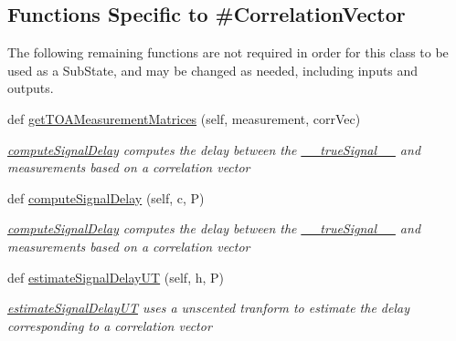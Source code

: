 \subsection*{Functions Specific to \#Correlation\+Vector}
\label{_amgrpb77571167b4af2d56b573fb28e024ebf}%
The following remaining functions are not required in order for this class to be used as a Sub\+State, and may be changed as needed, including inputs and outputs.\begin{DoxyCompactItemize}
\item 
def \hyperlink{classmodest_1_1substates_1_1correlationvector_1_1CorrelationVector_a71f11fa45819ecb464890be81ecc9781}{get\+T\+O\+A\+Measurement\+Matrices} (self, measurement, corr\+Vec)
\begin{DoxyCompactList}\small\item\em \hyperlink{classmodest_1_1substates_1_1correlationvector_1_1CorrelationVector_a0d0188e2923b59ba3e620927f1aaf84a}{compute\+Signal\+Delay} computes the delay between the \hyperlink{classmodest_1_1substates_1_1correlationvector_1_1CorrelationVector_af2f52cea1c695f36dd100f529c322e94}{\+\_\+\+\_\+true\+Signal\+\_\+\+\_\+} and measurements based on a correlation vector \end{DoxyCompactList}\item 
def \hyperlink{classmodest_1_1substates_1_1correlationvector_1_1CorrelationVector_a0d0188e2923b59ba3e620927f1aaf84a}{compute\+Signal\+Delay} (self, c, P)
\begin{DoxyCompactList}\small\item\em \hyperlink{classmodest_1_1substates_1_1correlationvector_1_1CorrelationVector_a0d0188e2923b59ba3e620927f1aaf84a}{compute\+Signal\+Delay} computes the delay between the \hyperlink{classmodest_1_1substates_1_1correlationvector_1_1CorrelationVector_af2f52cea1c695f36dd100f529c322e94}{\+\_\+\+\_\+true\+Signal\+\_\+\+\_\+} and measurements based on a correlation vector \end{DoxyCompactList}\item 
def \hyperlink{classmodest_1_1substates_1_1correlationvector_1_1CorrelationVector_a7bd7d1e68287728a48a414440c55c988}{estimate\+Signal\+Delay\+UT} (self, h, P)
\begin{DoxyCompactList}\small\item\em \hyperlink{classmodest_1_1substates_1_1correlationvector_1_1CorrelationVector_a7bd7d1e68287728a48a414440c55c988}{estimate\+Signal\+Delay\+UT} uses a unscented tranform to estimate the delay corresponding to a correlation vector \end{DoxyCompactList}\item 

\end{DoxyCompactItemize}
